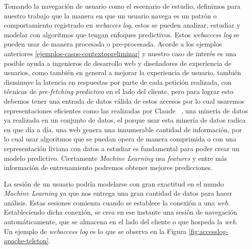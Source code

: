 	Tomando la navegación de usuario como el escenario de estudio, definimos para nuestro trabajo que la manera en que un usuario navega es un patrón o comportamiento registrado en \emph{webacces log}, estos se pueden analizar, estudiar y modelar con algoritmos que tengan enfoques predictivos. Estos \emph{webaccess log} se pueden usar de manera procesada o pre-procesada. Acorde a los ejemplos anteriores \ref{ejemplos-casos-contextopreliminar} y nuestro caso de interés es una posible ayuda a ingenieros de desarrollo web y diseñadores de experiencia de usuarios, como también en general a mejorar la experiencia de usuario, también disminuye  la latencia en respuestas por parte de cada petición realizada, con técnicas de \emph{pre-fetching predictivo} en el lado del cliente, pero para lograr esto debemos tener una entrada de datos válida de estos accesos por lo cual usaremos  representaciones eficientes como las realizadas por Claude \etal~\cite{Claude2014}, una  minería de datos ya realizada en un conjunto de datos, el porque usar esta minería de datos radica en que día a día, una web genera una innumerable cantidad de información, por lo cual usar algoritmos que se puedan opera de manera comprimida o con una representación liviana con datos a estudiar es fundamental para poder crear un modelo predictivo. Ciertamente \emph{Machine Learning} usa \emph{features} y entre más información de entrenamiento podremos  obtener mejores predicciones.
	
   La sesión de un usuario podría modelarse con gran exactitud en el mundo \emph{Machine Learning} ya que nos entrega una gran cantidad de datos para hacer análisis. Estas sesiones comienza cuando se establece la conexión a una \emph{web}. Estableciendo dicha conexión, se crea en ese instante una sesión de navegación automáticamente, que se almacena en el lado del cliente o que hospeda la \emph{web}. Un ejemplo de \emph{webaccess log} es lo que se observa en la Figura \ref{fig:accesslog-apache-teleton}.

